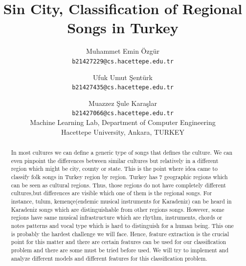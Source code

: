 \documentclass[10pt,twocolumn,letterpaper]{article}
\begin{document}
\title{Sin City, Classification of Regional Songs in Turkey}

\author{Muhammet Emin Özgür\\
{\tt\small b21427229@cs.hacettepe.edu.tr}
\and
Ufuk Umut Şentürk\\
{\tt\small b21427435@cs.hacettepe.edu.tr} \\
\and
Muazzez Şule Karaşlar\\
{\tt\small b21427066@cs.hacettepe.edu.tr}\\
{Machine Learning Lab, Department of Computer Engineering}\\
{Hacettepe University, Ankara, TURKEY}\\
}

\maketitle
\begin{abstract}
  In most cultures we can define a generic type of songs that defines the culture. We can even pinpoint the differences between similar cultures but relatively in a different region which might be city, county or state. This is the point where idea came to classify folk songs in Turkey region by region. Turkey has 7 geographic regions which can be seen as cultural regions. Thus, those regions do not have completely different cultures,but differences are visible which one of them is the regional songs. For instance, tulum, kemençe(endemic musical instruments for Karadeniz) can be heard in Karadeniz songs which are distinguishable from other regions songs. However, some regions have same musical infrastructure which are rhythm, instruments, chords or notes patterns and vocal type which is hard to distinguish for a human being. This one is probably the hardest challenge we will face. Hence, feature extraction is the crucial point for this matter and there are certain features can be used for our classification problem and there are some must be tried before used. We will try to implement and analyze different models and different features for this classification problem.
\end{abstract}
\end{document}
